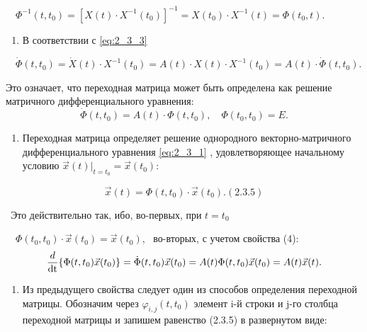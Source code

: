 		\ \  $\Phi ^{-1}(t,t_0)=\left[X(t)\cdot X^{-1}(t_0)\right]^{-1}=X(t_0)\cdot X^{-1}(t)=\Phi (t_0,t)$.


\liststyleWWviiiNumxxvii
\setcounter{saveenum}{\value{enumi}}
\begin{enumerate}
	\setcounter{enumi}{\value{saveenum}}
	\item 
			В соответствии с \eqref{eq:2_3_3}%
	
\end{enumerate}

		\ \  $\dot \Phi (t,t_0)=\dot X(t)\cdot X^{-1}(t_0)=A(t)\cdot X(t)\cdot X^{-1}(t_0)=A(t)\cdot \dot \Phi (t,t_0)$.



		Это означает, что переходная матрица может быть определена как решение матричного дифференциального уравнения:
\begin{equation}\label{eq:2_3_4}
	\dot \Phi (t,t_0)=A(t)\cdot \Phi (t,t_0),\quad \Phi (t_0,t_0)=E. %
\end{equation}


\liststyleWWviiiNumxxvii
\setcounter{saveenum}{\value{enumi}}
\begin{enumerate}
	\setcounter{enumi}{\value{saveenum}}
	\item 
			Переходная матрица определяет решение однородного векторно-матричного дифференциального уравнения \eqref{eq:2_3_1}%
			,
			удовлетворяющее начальному условию  $\vec x(t)|_{t=t_0}=\vec x(t_0)$:
	
\end{enumerate}
	\begin{equation}\label{eq:2_3_5}
		\vec x(t)=\Phi (t,t_0)\cdot \vec x(t_0).  (2.3.5)
	\end{equation}



		\ Это действительно так, ибо, во-первых, при  $t=t_0$



		\ \  $\Phi (t_0,t_0)\cdot \vec x(t_0)=\vec x(t_0)$,
		\ во-вторых, с учетом свойства (4): 
\begin{equation*}
		\frac d{\normalsubformula{\text{dt}}}\{\Phi (t,t_0)\vec x(t_0)\}=\dot \Phi (t,t_0)\vec x(t_0)=A(t)\Phi (t,t_0)\vec x(t_0)=A(t)\vec
		x(t).
\end{equation*}


\liststyleWWviiiNumxxvii
\setcounter{saveenum}{\value{enumi}}
\begin{enumerate}
	\setcounter{enumi}{\value{saveenum}}
	\item 
			Из предыдущего свойства следует один из способов определения переходной матрицы. Обозначим через  $\varphi _{i,j}(t,t_0)$
			элемент {i}-й строки и {j}-го столбца переходной матрицы и запишем равенство (2.3.5) в
			развернутом виде:
	
\end{enumerate}

